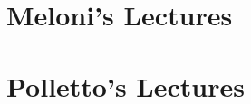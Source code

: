 \documentclass[11pt, a4paper, twoside, openright]{book}
\begin{document}
%
%
%
%
%
%






\mainmatter
\pagestyle{fancy}

\part{Meloni's Lectures}



 
 
 



\part{Polletto's Lectures}

\backmatter
\pagestyle{plain}



\end{document}
